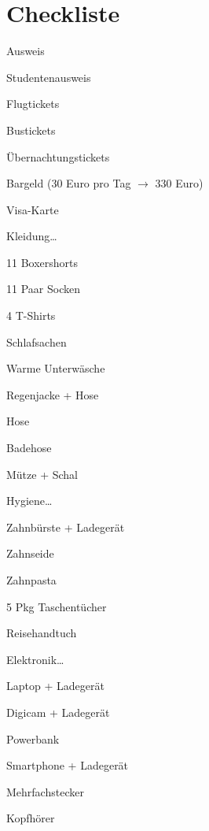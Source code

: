 \documentclass[a4paper]{scrartcl}
\begin{document}
\section*{Checkliste}
\begin{multicols}{3}
\begin{todolist}
    \item Ausweis
    \item Studentenausweis
    \item Flugtickets
    \item Bustickets
    \item Übernachtungstickets
    \item Bargeld (30 Euro pro Tag $\rightarrow$ 330 Euro)
    \item Visa-Karte
    \item Kleidung\dots
    \begin{todolist}
        \item 11 Boxershorts
        \item 11 Paar Socken
        \item 4 T-Shirts
        \item Schlafsachen
        \item Warme Unterwäsche
        \item Regenjacke + Hose
        \item Hose
        \item Badehose
        \item Mütze + Schal
    \end{todolist}
    \item Hygiene\dots
    \begin{todolist}
        \item Zahnbürste + Ladegerät
        \item Zahnseide
        \item Zahnpasta
        \item 5 Pkg Taschentücher
        \item Reisehandtuch
    \end{todolist}
    \item Elektronik\dots
    \begin{todolist}
        \item Laptop + Ladegerät
        \item Digicam + Ladegerät
        \item Powerbank
        \item Smartphone + Ladegerät
        \item Mehrfachstecker
        \item Kopfhörer
    \end{todolist}
\end{todolist}
\end{multicols}
\end{document}
